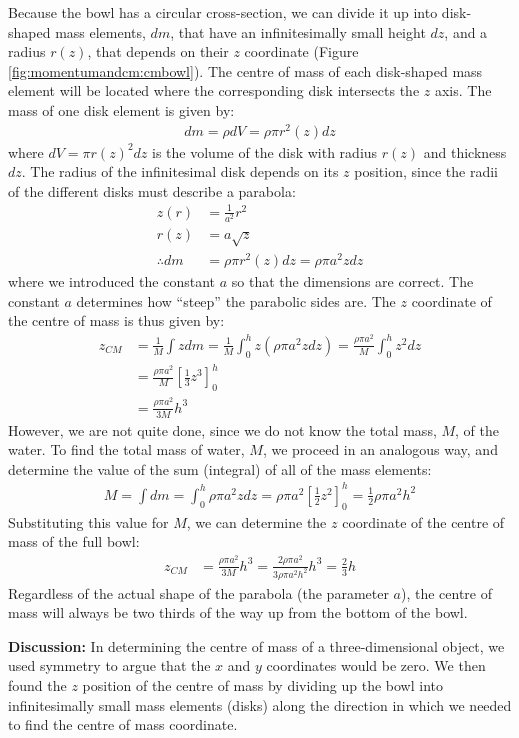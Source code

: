 \begin{example}
Because the bowl has a circular cross-section, we can divide it up into disk-shaped mass elements, $dm$, that have an infinitesimally small height $dz$, and a radius $r(z)$, that depends on their $z$ coordinate (Figure \ref{fig:momentumandcm:cmbowl}). 
The centre of mass of each disk-shaped mass element will be located where the corresponding disk intersects the $z$ axis. The mass of one disk element is given by:
\begin{align*}
dm = \rho dV = \rho \pi r^2(z) dz
\end{align*}
where $dV = \pi r(z)^2 dz$ is the volume of the disk with radius $r(z)$ and thickness $dz$. The radius of the infinitesimal disk depends on its $z$ position, since the radii of the different disks must describe a parabola:
\begin{align*}
z(r) &= \frac{1}{a^2}r^2\\
r(z) &= a\sqrt z\\
\therefore dm &= \rho \pi r^2(z) dz= \rho \pi a^2  z dz
\end{align*}
where we introduced the constant $a$ so that the dimensions are correct. The constant $a$ determines how ``steep'' the parabolic sides are. The $z$ coordinate of the centre of mass is thus given by:
\begin{align*}
z_{CM} &=  \frac{1}{M}\int z dm =\frac{1}{M}\int_0^h z  (\rho \pi a^2 z dz)=\frac{\rho \pi a^2}{M}\int_0^h z^2dz \\
&=\frac{\rho \pi a^2}{M}\left[ \frac{1}{3}z^3 \right]_0^h\\
&=\frac{\rho \pi a^2}{3M}h^3
\end{align*}
However, we are not quite done, since we do not know the total mass, $M$, of the water. To find the total mass of water, $M$, we proceed in an analogous way, and determine the value of the sum (integral) of all of the mass elements:
\begin{align*}
M = \int dm = \int_0^h \rho \pi a^2 z dz = \rho \pi a^2 \left[ \frac{1}{2}z^2 \right]_0^h= \frac{1}{2}\rho \pi a^2 h^2
\end{align*}
Substituting this value for $M$, we can determine the $z$ coordinate of the centre of mass of the full bowl:
\begin{align*}
z_{CM} &=\frac{\rho \pi a^2}{3M}h^3 = \frac{2\rho \pi a^2}{3\rho \pi a^2 h^2}h^3=\frac{2}{3}h
\end{align*}
Regardless of the actual shape of the parabola (the parameter $a$), the centre of mass will always be two thirds of the way up from the bottom of the bowl.

\textbf{Discussion: }In determining the centre of mass of a three-dimensional object, we used symmetry to argue that the $x$ and $y$ coordinates would be zero. We then found the $z$ position of the centre of mass by dividing up the bowl into infinitesimally small mass elements (disks) along the direction in which we needed to find the centre of mass coordinate.
\end{example}

